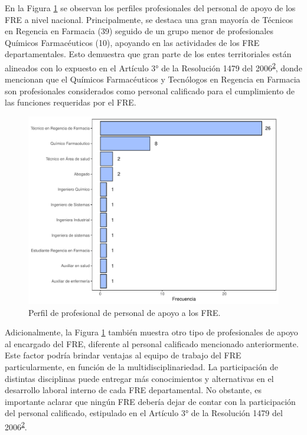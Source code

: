 \documentclass[
]{book}
\begin{document}
En la Figura \ref{fig:perfilProfesional2} se observan los perfiles profesionales del personal de apoyo de los FRE a nivel nacional. Principalmente, se destaca una gran mayoría de Técnicos en Regencia en Farmacia (39) seguido de un grupo menor de profesionales Químicos Farmacéuticos (10), apoyando en las actividades de los FRE departamentales. Esto demuestra que gran parte de los entes territoriales están alineados con lo expuesto en el Artículo 3° de la Resolución 1479 del 2006\textsuperscript{\protect\hyperlink{ref-MSPS1479-2006}{2}}, donde mencionan que el Químicos Farmacéuticos y Tecnólogos en Regencia en Farmacia son profesionales considerados como personal calificado para el cumplimiento de las funciones requeridas por el FRE.

\begin{figure}[t]

{\centering \includegraphics[width=0.9\linewidth]{InformeFinal_files/figure-latex/perfilProfesional2-1} 

}

\caption{Perfil de profesional de personal de apoyo a los FRE.}\label{fig:perfilProfesional2}
\end{figure}

Adicionalmente, la Figura \ref{fig:perfilProfesional2} también muestra otro tipo de profesionales de apoyo al encargado del FRE, diferente al personal calificado mencionado anteriormente. Este factor podría brindar ventajas al equipo de trabajo del FRE particularmente, en función de la multidisciplinariedad. La participación de distintas disciplinas puede entregar más conocimientos y alternativas en el desarrollo laboral interno de cada FRE departamental. No obstante, es importante aclarar que ningún FRE debería dejar de contar con la participación del personal calificado, estipulado en el Artículo 3° de la Resolución 1479 del 2006\textsuperscript{\protect\hyperlink{ref-MSPS1479-2006}{2}}.
\end{document}
